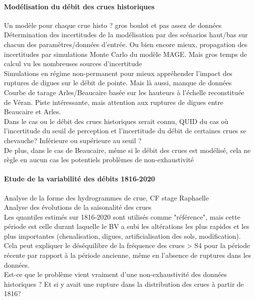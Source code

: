 	\paragraph{Modélisation du débit des crues historiques}
	Un modèle pour chaque crue histo ? gros boulot et pas assez de données\\
	Détermination des incertitudes de la modélisation par des scénarios haut/bas sur chacun des paramètres/données d'entrée. Ou bien encore mieux, propagation des incertitudes par simulations Monte Carlo du modèle MAGE. Mais gros temps de calcul vu les nombreuses sources d'incertitude\\
	Simulations en régime non-permanent pour mieux appréhender l'impact des ruptures de digues sur le débit de pointe. Mais là aussi, manque de données\\
	Courbe de tarage Arles/Beaucaire basée sur les hauteurs à l'échelle reconstituée de Véran. Piste intéressante, mais attention aux ruptures de digues entre Beaucaire et Arles.\\
	Dans le cas ou le débit des crues historiques serait connu, QUID du cas où l'incertitude du seuil de perception et l'incertitude du débit de certaines crues se chevauche? Inférieure ou supérieure au seuil ?\\
	De plus, dans le cas de Beaucaire, même si le débit des crues est modélisé, cela ne règle en aucun cas les potentiels problèmes de non-exhaustivité\\
		
	\paragraph{Etude de la variabilité des débits 1816-2020}
	Analyse de la forme des hydrogrammes de crue, CF stage Raphaelle\\
	Analyse des évolutions de la saisonalité des crues\\
	Les quantiles estimés sur 1816-2020 sont utilisés comme "référence", mais cette période est celle durant laquelle le BV a subi les altérations les plus rapides et les plus importantes (chenalisation, digues, artificialisation des sols, modification). Cela peut expliquer le déséquilibre de la fréquence des crues > S4 pour la période récente par rapport à la période ancienne, même en l'absence de ruptures dans les données.\\
	Est-ce que le problème vient vraiment d'une non-exhaustivité des données historiques ? Et si y avait une rupture dans la distribution des crues à partir de 1816?
	
